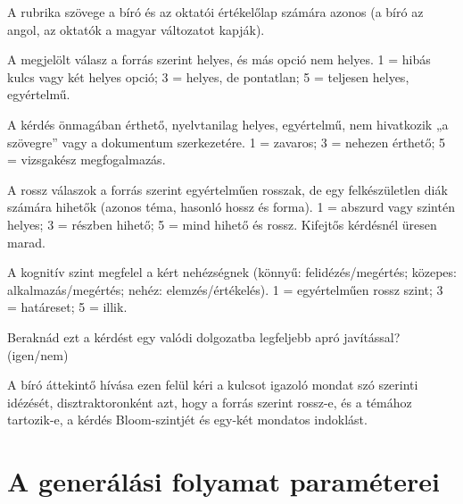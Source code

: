 A rubrika szövege a bíró és az oktatói értékelőlap számára azonos (a bíró az angol, az oktatók a magyar
változatot kapják).

\begin{description}[style=nextline,leftmargin=0.6cm]
\item[Helyesség] A megjelölt válasz a forrás szerint helyes, és más opció nem helyes.
1 = hibás kulcs vagy két helyes opció; 3 = helyes, de pontatlan; 5 = teljesen helyes, egyértelmű.
\item[Érthetőség] A kérdés önmagában érthető, nyelvtanilag helyes, egyértelmű, nem hivatkozik „a
szövegre” vagy a dokumentum szerkezetére. 1 = zavaros; 3 = nehezen érthető; 5 = vizsgakész
megfogalmazás.
\item[Disztraktorok] A rossz válaszok a forrás szerint egyértelműen rosszak, de egy felkészületlen
diák számára hihetők (azonos téma, hasonló hossz és forma). 1 = abszurd vagy szintén helyes;
3 = részben hihető; 5 = mind hihető és rossz. Kifejtős kérdésnél üresen marad.
\item[Szintillesztés] A kognitív szint megfelel a kért nehézségnek (könnyű: felidézés/megértés;
közepes: alkalmazás/megértés; nehéz: elemzés/értékelés). 1 = egyértelműen rossz szint;
3 = határeset; 5 = illik.
\item[Felhasználnám] Beraknád ezt a kérdést egy valódi dolgozatba legfeljebb apró javítással?
(igen/nem)
\end{description}

A bíró áttekintő hívása ezen felül kéri a kulcsot igazoló mondat szó szerinti idézését,
disztraktoronként azt, hogy a forrás szerint rossz-e, és a témához tartozik-e, a
kérdés Bloom-szintjét és egy-két mondatos indoklást.

\chapter{A generálási folyamat paraméterei}
\label{app-reprodukcio}

